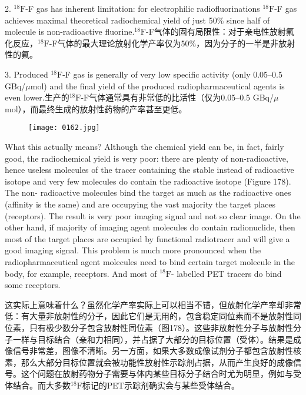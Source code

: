 \documentclass[dvipsnames, svgnames,a4paper,11pt]{article}
\begin{document}
2. ${}^\mathrm{18}\mathrm{F}$-F gas has inherent limitation: for electrophilic radiofluorinations ${}^\mathrm{18}\mathrm{F}$-F gas
achieves maximal theoretical radiochemical yield of just 50\% since half of
molecule is non-radioactive fluorine.${}^\mathrm{18}\mathrm{F}$-F气体的固有局限性：对于亲电性放射氟化反应，${}^\mathrm{18}\mathrm{F}$-F气体的最大理论放射化学产率仅为50\%，因为分子的一半是非放射性的氟。

3. Produced ${}^\mathrm{18}\mathrm{F}$-F gas is generally of very low specific activity (only 0.05–0.5
GBq/$\mu$mol) and the final yield of the produced radiopharmaceutical agents is
even lower.生产的${}^\mathrm{18}\mathrm{F}$-F气体通常具有非常低的比活性（仅为0.05–0.5 GBq/$\mu$mol），而最终生成的放射性药物的产率甚至更低。

\begin{figure}[h]
	\centering
    \texttt{[image: 0162.jpg]}    
     \label{fig178}
\end{figure}

What this actually means? Although the chemical yield can be, in fact, fairly good,
the radiochemical yield is very poor: there are plenty of non-radioactive, hence
useless molecules of the tracer containing the stable instead of radioactive isotope
and very few molecules do contain the radioactive isotope (Figure 178). The non-
radioactive molecules bind the target as much as the radioactive ones (affinity is the same) and are occupying the vast majority the target places (receptors). The result is
very poor imaging signal and not so clear image. On the other hand, if majority of
imaging agent molecules do contain radionuclide, then most of the target places are
occupied by functional radiotracer and will give a good imaging signal. This problem
is much more pronounced when the radiopharmaceutical agent molecules need to
bind certain target molecule in the body, for example, receptors. And most of ${}^\mathrm{18}\mathrm{F}$-
labelled PET tracers do bind some receptors.

这实际上意味着什么？虽然化学产率实际上可以相当不错，但放射化学产率却非常低：有大量非放射性的分子，因此它们是无用的，包含稳定同位素而不是放射性同位素，只有极少数分子包含放射性同位素（图178）。这些非放射性分子与放射性分子一样与目标结合（亲和力相同），并占据了大部分的目标位置（受体）。结果是成像信号非常差，图像不清晰。另一方面，如果大多数成像试剂分子都包含放射性核素，那么大部分目标位置就会被功能性放射性示踪剂占据，从而产生良好的成像信号。这个问题在放射药物分子需要与体内某些目标分子结合时尤为明显，例如与受体结合。而大多数${}^\mathrm{18}\mathrm{F}$标记的PET示踪剂确实会与某些受体结合。
\end{document}
